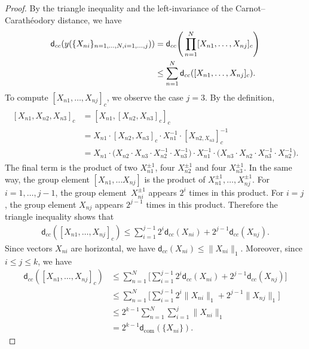 \documentclass[pdftex]{sigma}
\numberwithin{equation}{section}
\begin{document}
\begin{proof}
 By the triangle inequality and the left-invariance of the Carnot--Carath\'eodory distance,
 we have
 \begin{align}
 \mathsf{d}_{cc}(y(\{X_{ni}\}_{n=1,\dots,N,i=1,\dots,j}))&=\mathsf{d}_{cc}
 \Bigg(\prod_{n=1}^N[X_{n1},\dots,X_{nj}]_c\Bigg) \notag \\
 &\leq \sum_{n=1}^N\mathsf{d}_{cc}([X_{n1},\dots,X_{nj}]_c).\label{eqyntri}
 \end{align}
 To compute $[X_{n1},\dots,X_{nj}]_c$,
 we observe the case $j=3$.
By the definition,
\begin{align*}
\begin{split}
 [X_{n1},X_{n2},X_{n3}]_c&=[X_{n1},[X_{n2},X_{n3}]_c]_c
 \\
 &=X_{n1}\cdot[X_{n2},X_{n3}]_c\cdot X_{n1}^{-1}\cdot[X_{n2,X_{n3}}]_c^{-1}
 \\
 &=X_{n1}\cdot \bigl(X_{n2}\cdot X_{n3}\cdot X_{n2}^{-1}\cdot X_{n3}^{-1}\bigr)\cdot X_{n1}^{-1}\cdot \bigl(X_{n3}\cdot X_{n2}\cdot X_{n3}^{-1}\cdot X_{n2}^{-1}\bigr).
 \end{split}
\end{align*}
The final term is the product of two $X_{n1}^{\pm1}$,
four $X_{n2}^{\pm 1}$ and four $X_{n3}^{\pm 1}$.
In the same way,
the group element $[X_{n1},\dots X_{nj}]$ is the product of $X_{n1}^{\pm 1},\dots,X_{nj}^{\pm 1}$.
 For $i=1,\dots,j-1$,
 the group ele\-ment~$X_{ni}^{\pm 1}$ appears $2^i$ times in this product.
 For $i=j$,
 the group element $X_{nj}$ appears $2^{j-1}$ times in this product.
Therefore the triangle inequality shows that
 \begin{gather}\label{eqytri}
 \mathsf{d}_{cc}([X_{n1},\dots,X_{nj}]_c)\leq \sum_{i=1}^{j-1}2^i\mathsf{d}_{cc}(X_{ni})+2^{j-1}\mathsf{d}_{cc}(X_{nj}).
 \end{gather}
Since vectors $X_{ni}$ are horizontal,
we have $\mathsf{d}_{cc}(X_{ni})\leq\|X_{ni}\|_1$.
Moreover,
since $i\leq j\leq k$,
we have
\begin{align*}
 \mathsf{d}_{cc}([X_{n1},\dots,X_{nj}]_c)
 &\leq\sum_{n=1}^N\Bigg[\sum_{i=1}^{j-1}2^i\mathsf{d}_{cc}(X_{ni})+2^{j-1}\mathsf{d}_{cc}(X_{nj})\Bigg]
 \\
& \leq\sum_{n=1}^N\Bigg[\sum_{i=1}^{j-1}2^i\|X_{ni}\|_1+2^{j-1}\|X_{nj}\|_1\Bigg]
\\
& \leq 2^{k-1}\sum_{n=1}^N\sum_{i=1}^j\|X_{ni}\|_1
\\
& = 2^{k-1}\mathsf{d}_{\mathrm{com}}(\{X_{ni}\}).\tag*{\qed}
\end{align*}
\renewcommand{\qed}{}
\end{proof}
\end{document}
